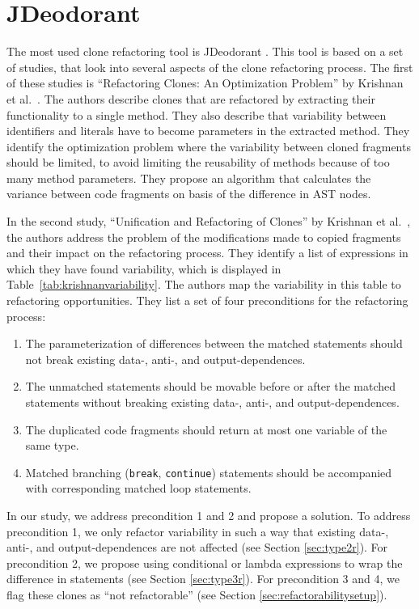 \section{JDeodorant} \label{sec:jdeodorant}
The most used clone refactoring tool is JDeodorant \cite{mazinanian2016jdeodorant}. This tool is based on a set of studies, that look into several aspects of the clone refactoring process. The first of these studies is ``Refactoring Clones: An Optimization Problem'' by Krishnan et al.~\cite{krishnan2013refactoring}. The authors describe clones that are refactored by extracting their functionality to a single method. They also describe that variability between identifiers and literals have to become parameters in the extracted method. They identify the optimization problem where the variability between cloned fragments should be limited, to avoid limiting the reusability of methods because of too many method parameters. They propose an algorithm that calculates the variance between code fragments on basis of the difference in AST nodes.

In the second study, ``Unification and Refactoring of Clones'' by Krishnan et al.~\cite{krishnan2014unification}, the authors address the problem of the modifications made to copied fragments and their impact on the refactoring process. They identify a list of expressions in which they have found variability, which is displayed in Table~\ref{tab:krishnanvariability}. The authors map the variability in this table to refactoring opportunities. They list a set of four preconditions for the refactoring process:
\begin{enumerate}
  \item The parameterization of differences between the matched statements should not break existing data-, anti-, and output-dependences.
  \item The unmatched statements should be movable before or after the matched statements without breaking existing data-, anti-, and output-dependences.
  \item The duplicated code fragments should return at most one variable of the same type.
  \item Matched branching (\texttt{break}, \texttt{continue}) statements should be accompanied with corresponding matched loop statements.
\end{enumerate}
In our study, we address precondition 1 and 2 and propose a solution. To address precondition 1, we only refactor variability in such a way that existing data-, anti-, and output-dependences are not affected (see Section \ref{sec:type2r}). For precondition 2, we propose using conditional or lambda expressions to wrap the difference in statements (see Section \ref{sec:type3r}). For precondition 3 and 4, we flag these clones as ``not refactorable'' (see Section \ref{sec:refactorabilitysetup}).


